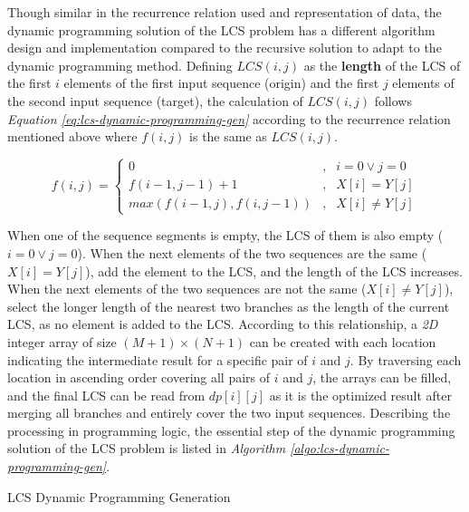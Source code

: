 \documentclass[sigplan,screen]{acmart}
\begin{document}
Though similar in the recurrence relation used and representation of data, the dynamic programming solution of the LCS problem has a different algorithm design and implementation compared to the recursive solution to adapt to the dynamic programming method. Defining $LCS(i, j)$ as the \textbf{length} of the LCS of the first $i$ elements of the first input sequence (origin) and the first $j$ elements of the second input sequence (target), the calculation of $LCS(i, j)$ follows \textit{Equation \ref{eq:lcs-dynamic-programming-gen}} according to the recurrence relation mentioned above where $f(i, j)$ is the same as $LCS(i, j)$. \cite{jiangApproximationShortestCommon1995}

\begin{equation}
    \label{eq:lcs-dynamic-programming-gen}
    f(i, j) = \left \{
    \begin{aligned}
        0 &, & i = 0 \vee j = 0 \\
        f(i-1, j-1) + 1 &, & X[i] = Y[j] \\
        max(f(i-1, j), f(i, j-1)) &, & X[i] \neq Y[j]
    \end{aligned}
    \right.
\end{equation}

When one of the sequence segments is empty, the LCS of them is also empty ($i = 0 \vee j = 0$). When the next elements of the two sequences are the same ($X[i] = Y[j]$), add the element to the LCS, and the length of the LCS increases. When the next elements of the two sequences are not the same ($X[i] \neq Y[j]$), select the longer length of the nearest two branches as the length of the current LCS, as no element is added to the LCS. \cite{hirschbergLinearSpaceAlgorithm1975} According to this relationship, a \textit{2D} integer array of size $(M+1)\times(N+1)$ can be created with each location indicating the intermediate result for a specific pair of $i$ and $j$. By traversing each location in ascending order covering all pairs of $i$ and $j$, the arrays can be filled, and the final LCS can be read from $dp[i][j]$ as it is the optimized result after merging all branches and entirely cover the two input sequences. Describing the processing in programming logic, the essential step of the dynamic programming solution of the LCS problem is listed in \textit{Algorithm \ref{algo:lcs-dynamic-programming-gen}}.

\begin{algorithm}
    \caption{LCS Dynamic Programming Generation}
    \label{algo:lcs-dynamic-programming-gen}
\end{algorithm}
\end{document}
